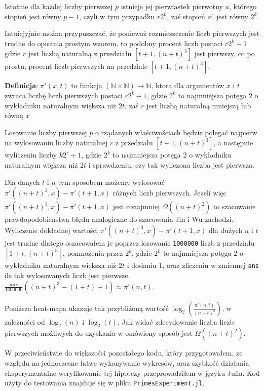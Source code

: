 \documentclass{article}
\begin{document}
Istotnie dla każdej liczby pierwszej $p$ istnieje jej pierwiastek pierwotny $a$,
którego stopień jest równy $p-1$, czyli w tym przypadku $r2^k$, zaś stopień $a^r$ jest równy $2^k$.


Intuicjyjnie można przypuszczać, że ponieważ rozmieszczenie liczb pierwszych jest trudne 
do opisania prostym wzorem, to podobny procent liczb postaci $r2^k+1$ gdzie $r$ jest liczbą
naturalną z przedziału $[t+1,(n+t)^3]$ jest pierwszy, co po prostu, procent liczb 
pierwszych na przedziale $[t+1,(n+t)^3]$. 

\begin{tcolorbox}
    \textbf{Definicja}: $\pi'(x,t)$ to funkcja $(\mathbb{N} \times \mathbb{N}) \to \mathbb{N}$, ktora dla argumentów $x$ i
    $t$ zwraca liczbę liczb pierwszych postaci $r2^k+1$, gdzie $2^k$ to najmniejsza potęga $2$ o wykładniku naturalnym
    większa niż $2t$, zaś $r$ jest liczbą naturalną mniejszą lub równą $x$
\end{tcolorbox}

Losowanie liczby pierwszej $p$ o rządanych właściwościach będzie polegać najpierw na wylosowaniu liczby naturalnej $r$
z przedziału $[t+1,(n+t)^3]$, a następnie wyliczeniu liczby $k2^r+1$, gdzie $2^k$ to najmniejsza potęga $2$ o wykładniku naturalnym większa niż $2t$ i sprawdzeniu, czy tak wyliczona liczba jest pierwsza.

Dla danych $t$ i $n$ tym sposobem możemy wylosować $\pi'((n+t)^3,x)-\pi'(t+1,x)$ różnych liczb pierwszych. Jeżeli 
więc $\pi'((n+t)^3,x)-\pi'(t+1,x)$ jest conajmniej $\Omega((n+t)^2)$ to szacowanie prawdopodobieństwa błędu analogiczne do szacowania 
Jin i Wu zachodzi. Wyliczenie dokładnej wartości $\pi'((n+t)^3,x)-\pi'(t+1,x)$ dla dużych $n$ i $t$ jest trudne 
dlatego oszacowałem je poprzez losowanie \texttt{1000000} liczb z przedziału $[1+t,(n+t)^3]$, pomnożeniu przez $2^k$, gdzie $2^k$ to najmniejsza potęga $2$ o wykładniku naturalnym
większa niż $2t$ i dodaniu $1$, oraz zliczeniu w zmiennej \texttt{ans} ile tak wylosowanych liczb jest pierwsze. 
$\frac{ans}{1000000}((n+t)^3-(1+t)+1) \approx \pi'(n,t)$.

Poniższa heat-mapa ukazuje tak przybliżoną wartość $\log_2(\frac{\pi'(n,t)}{(n+t)^2})$, w zależności od $\log_2(n)$ i $\log_2(t)$. Jak widać zdecydowanie liczba liczb pierwszych możliwych do uzyskania w omówiony sposób
jest $\Omega((n+t)^2)$.

W przeciwieństwie do większości pozostałego kodu, który przygotowałem, ze względu na jednoczesne łatwe wykonywanie wykresów, oraz szybkość działania eksperymentalne weryfikowanie
tej hipotezy przeprowadziłem w języku Julia. Kod użyty do testowania znajduje się  w pliku \texttt{PrimesExperiment.jl}.
\end{document}

